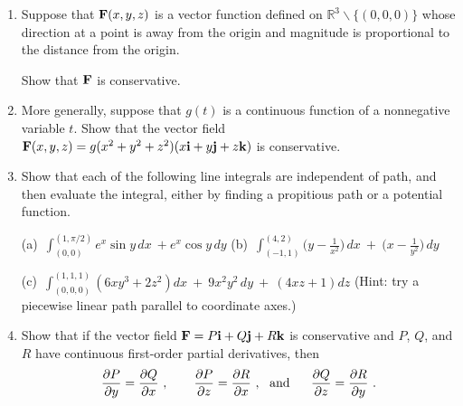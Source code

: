 \documentclass[12pt]{article}
\newcommand{\RR}{{\mathbb R}}  %
\newcommand{\bfF}{{\bf F}}    %
\newcommand{\bfi}{{\bf i}}    %
\newcommand{\bfj}{{\bf j}}    %
\newcommand{\bfk}{{\bf k}}    %
\begin{document}
\begin{enumerate}
\item Suppose that $\bfF(x,y,z)$ is a vector function defined on $\RR^{3}\smallsetminus\{(0,0,0)\}$ whose direction at a point  is away
  from the origin and magnitude is proportional to the distance from the origin.

  Show that $\bfF$ is conservative.  \vspace{-2pt}

   
\item More generally, suppose that $g(t)$ is a continuous function of a nonnegative variable $t$.
  Show that the vector field $\bfF(x,y,z)=g(x^2+y^2+z^2) ( x\bfi + y \bfj + z \bfk)$ is conservative.\vspace{-2pt}
   
 
   
\item Show that each of the following line integrals are independent of path, and then evaluate the integral, either by finding a propitious
  path or a potential function.
  
  (a)\ ${\displaystyle \int_{(0,0)}^{(1,\pi/2)} e^x \sin y\, dx \ + e^x \cos y\, dy}$
  \qquad
  (b)\ ${\displaystyle \int_{(-1,1)}^{(4,2)} \bigl(y - \frac{1}{x^2}\bigr)\, dx\ +\ \bigl(x - \frac{1}{y^2}\bigr)\, dy}$\vspace{4pt}

  (c)\ ${\displaystyle \int_{(0,0,0)}^{(1,1,1)} (6x y^3 + 2z^2) dx\ +\ 9x^2y^2\,dy\ +\ (4xz+1)dz}$\newline
  (Hint: try a piecewise linear path parallel to coordinate axes.)
 \vspace{-2pt}

   
\item Show that if the vector field $\bfF= P\bfi + Q\bfj + R\bfk$ is conservative and $P$, $Q$, and $R$ have continuous first-order partial
  derivatives, then\vspace{-4pt}
  \[
  \frac{\partial P}{\partial y}=\frac{\partial Q}{\partial x}\ ,
  \qquad
  \frac{\partial P}{\partial z}=\frac{\partial R}{\partial x}\ , \ \mbox{ and }\ 
  \quad
  \frac{\partial Q}{\partial z}=\frac{\partial R}{\partial y}\ .
  \vspace{-2pt}
  \]


\end{enumerate}
\end{document}

